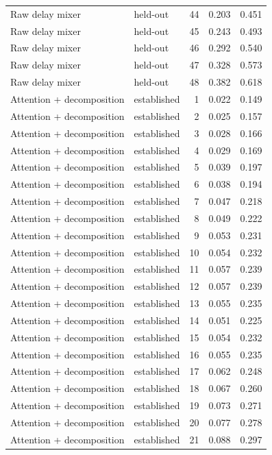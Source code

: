 \begin{tabular}{llrrr}
Raw delay mixer & held-out & 44 & 0.203 & 0.451 \\
Raw delay mixer & held-out & 45 & 0.243 & 0.493 \\
Raw delay mixer & held-out & 46 & 0.292 & 0.540 \\
Raw delay mixer & held-out & 47 & 0.328 & 0.573 \\
Raw delay mixer & held-out & 48 & 0.382 & 0.618 \\
Attention + decomposition & established & 1 & 0.022 & 0.149 \\
Attention + decomposition & established & 2 & 0.025 & 0.157 \\
Attention + decomposition & established & 3 & 0.028 & 0.166 \\
Attention + decomposition & established & 4 & 0.029 & 0.169 \\
Attention + decomposition & established & 5 & 0.039 & 0.197 \\
Attention + decomposition & established & 6 & 0.038 & 0.194 \\
Attention + decomposition & established & 7 & 0.047 & 0.218 \\
Attention + decomposition & established & 8 & 0.049 & 0.222 \\
Attention + decomposition & established & 9 & 0.053 & 0.231 \\
Attention + decomposition & established & 10 & 0.054 & 0.232 \\
Attention + decomposition & established & 11 & 0.057 & 0.239 \\
Attention + decomposition & established & 12 & 0.057 & 0.239 \\
Attention + decomposition & established & 13 & 0.055 & 0.235 \\
Attention + decomposition & established & 14 & 0.051 & 0.225 \\
Attention + decomposition & established & 15 & 0.054 & 0.232 \\
Attention + decomposition & established & 16 & 0.055 & 0.235 \\
Attention + decomposition & established & 17 & 0.062 & 0.248 \\
Attention + decomposition & established & 18 & 0.067 & 0.260 \\
Attention + decomposition & established & 19 & 0.073 & 0.271 \\
Attention + decomposition & established & 20 & 0.077 & 0.278 \\
Attention + decomposition & established & 21 & 0.088 & 0.297 \\

\end{tabular}
